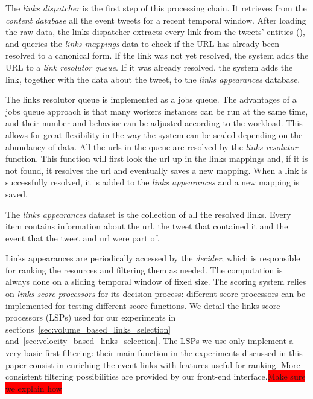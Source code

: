 \documentclass{sig-alternate}
\newcommand{\todo}[1]{\colorbox{red}{#1}}
\begin{document}
The \emph{links dispatcher} is the first step of this processing chain. It retrieves from the \emph{content database} all the event tweets for a recent temporal window. After loading the raw data, the links dispatcher extracts every link from the tweets' entities (\cite{RestTweetsDoc}), and queries the \emph{links mappings} data to check if the URL has already been resolved to a canonical form. If the link was not yet resolved, the system adds the URL to a \emph{link resolutor queue}. If it was already resolved, the system adds the link, together with the data about the tweet, to the \emph{links appearances} database. 

The links resolutor queue is implemented as a jobs queue\cite{RedisQueues}. The advantages of a jobs queue approach is that many workers instances can be run at the same time, and their number and behavior can be adjusted according to the workload. This allows for great flexibility in the way the system can be scaled depending on the abundancy of data.
All the urls in the queue are resolved by the \emph{links resolutor} function. This function will first look the url up in the links mappings and, if it is not found, it resolves the url and eventually saves a new mapping. When a link is successfully resolved, it is added to the \emph{links appearances} and a new mapping is saved.

The \emph{links appearances} dataset is the collection of all the resolved links. Every item contains information about the url, the tweet that contained it and the event that the tweet and url were part of. %

Links appearances are periodically accessed by the \emph{decider}, which is responsible for ranking the resources and filtering them as needed. The computation is always done on a sliding temporal window of fixed size. The scoring system relies on \emph{links score processors} for its decision process: different score processors can be implemented for testing different score functions. We detail the links score processors (LSPs) used for our experiments in sections~\ref{sec:volume_based_links_selection} and~\ref{sec:velocity_based_links_selection}. The LSPs we use only implement a very basic first filtering: their main function in the experiments discussed in this paper consist in enriching the event links with features useful for ranking. More consistent filtering possibilities are provided by our front-end interface.\todo{Make sure we explain how}
\end{document}
